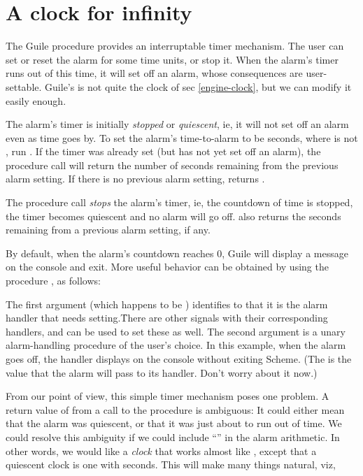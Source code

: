 \chapter{A clock for infinity}
\label{clock}

The Guile \cite{guile} procedure  provides an interruptable
timer mechanism.  The user can set or reset the alarm
for some time units, or stop it.  When the alarm's
timer runs out of this time, it will set off an alarm,
whose consequences are user-settable.  Guile's
 is not quite the clock of
sec \ref{engine-clock}, but we can modify it easily
enough.

The alarm's timer is initially {\em stopped} or {\em
quiescent}, ie, it will not set off an alarm even as
time goes by.  To set the alarm's time-to-alarm to be
 seconds, where  is not , run .  If the timer was already set (but has not yet set
off an alarm), the  procedure call will
return the number of seconds remaining from the
previous alarm setting.  If there is no previous alarm
setting,  returns .

The procedure call  {\em stops} the
alarm's timer, ie, the countdown of time is stopped,
the timer becomes quiescent and no alarm will go off.
 also returns the seconds remaining from a
previous alarm setting, if any.

By default, when the alarm's countdown reaches 0,
Guile will display a message on the console and exit.
More useful behavior can be obtained by
using the procedure
, as follows:


\n
The first argument  (which happens to be
) identifies to  that it is the
alarm handler that needs setting.\f{There are other
signals with their corresponding handlers, and
 can be used to set these as well.}  The
second argument is a unary alarm-handling procedure of
the user's choice.  In this example, when the alarm
goes off, the handler displays  on the console without exiting Scheme.
(The  is the  value that the alarm
will pass to its handler.  Don't worry about it now.)

From our point of view, this simple timer mechanism
poses one problem.  A return value of  from a call
to the procedure  is ambiguous: It could
either mean that the alarm was quiescent, or that 
it was just about to run out of time.  We could resolve
this ambiguity if we could include ``''
in the alarm arithmetic.  In other words, we would like
a {\em clock} that works almost like ,
except that a quiescent clock is one with
 seconds.  This will make many things
natural, viz,

